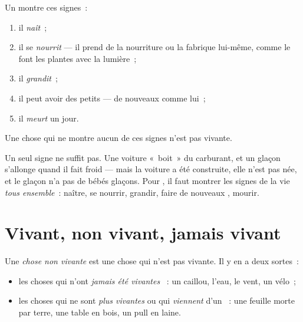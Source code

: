 \begin{proposition}\label{prop:g1:living-or-not:signs}
Un  montre ces signes~:
\begin{enumerate}
  \item il \emph{naît}~;
  \item il se \emph{nourrit} --- il prend de la
        nourriture ou la fabrique lui-même, comme le font les
        plantes avec la lumière~;
  \item il \emph{grandit}~;
  \item il peut avoir des petits --- de nouveaux 
        comme lui~;
  \item il \emph{meurt} un jour.
\end{enumerate}
Une chose qui ne montre aucun de ces signes n'est pas vivante.
\end{proposition}
\admitted

\begin{remark}\label{rem:g1:living-or-not:allsigns}
Un seul signe ne suffit pas. Une voiture «~boit~» du carburant, et
un glaçon s'allonge quand il fait froid --- mais la voiture a été
construite, elle n'est pas née, et le glaçon n'a pas de bébés
glaçons. Pour , il faut montrer les signes de la vie
\emph{tous ensemble}~: naître, se nourrir, grandir, faire de
nouveaux , mourir.
\end{remark}

\section{Vivant, non vivant, jamais vivant}

\begin{definition}\label{def:g1:living-or-not:nonliving}
Une \emph{chose non vivante} est une chose
qui n'est pas vivante. Il y en a deux sortes~:
\begin{itemize}
  \item les choses qui n'ont \emph{jamais été vivantes}
~: un caillou, l'eau, le vent, un vélo~;
  \item les choses qui ne sont \emph{plus vivantes}
ou qui \emph{viennent} d'un ~: une
        feuille morte par terre, une table en bois, un pull en laine.
\end{itemize}
\end{definition}

